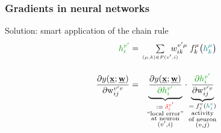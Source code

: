\begin{frame} \frametitle{Gradients in neural networks} 

	\vspace{9mm}
	\begin{block}{Solution: smart application of the chain rule}
		\begin{eqnarray*}
			{\color{darkgreen}h_i^{v'}} 
	   			&=& \kern-2ex\smallsum{(\mu,k) \in P(v',i)}{} \kern-2ex
	   			w_{ik}^{v'\mu}\;  f_k^\mu\big( {\color{teal} h_k^\mu} \big)
	   		\\[4mm]
			\frac{\partial y(\vec{x}; \vec{w})}{\partial \mathrm{w}_{ij}^{v'v}}
				&=& \underbrace{\frac{\partial y(\vec{x}; \vec{w})}
					{{\color{darkgreen}\partial h_i^{v'}}} }_{ 
						\substack{\coloneqq\;{\color{red}\delta_i^{v'}} \\
						\text{``local error''} \\
						\text{at neuron} \\
						(v', i)}
					}
				  \cdot 
				  \underbrace{\frac{{\color{darkgreen}\partial h_i^{v'}}}
				  	{\partial \mathrm{w}_{ij}^{v'v}}}_{
						\substack{=\;f_j^v({\color{teal} h_j^v}) \\
						\text{activity} \\
						\text{of neuron} \\
						(v, j)}}
		\end{eqnarray*}
	\end{block}
\end{frame}

